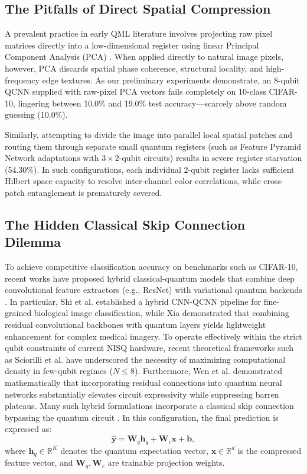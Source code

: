 \documentclass[10pt,twocolumn,twoside,a4paper]{article}
\begin{document}
\subsection{The Pitfalls of Direct Spatial Compression}
A prevalent practice in early QML literature involves projecting raw pixel matrices directly into a low-dimensional register using linear Principal Component Analysis (PCA) \cite{lloyd2014quantum}. When applied directly to natural image pixels, however, PCA discards spatial phase coherence, structural locality, and high-frequency edge textures. As our preliminary experiments demonstrate, an 8-qubit QCNN supplied with raw-pixel PCA vectors fails completely on 10-class CIFAR-10, lingering between 10.0\% and 19.0\% test accuracy---scarcely above random guessing (10.0\%).

Similarly, attempting to divide the image into parallel local spatial patches and routing them through separate small quantum registers (such as Feature Pyramid Network adaptations with $3 \times 2$-qubit circuits) results in severe register starvation (54.30\%). In such configurations, each individual 2-qubit register lacks sufficient Hilbert space capacity to resolve inter-channel color correlations, while cross-patch entanglement is prematurely severed.

\subsection{The Hidden Classical Skip Connection Dilemma}
To achieve competitive classification accuracy on benchmarks such as CIFAR-10, recent works have proposed hybrid classical-quantum models that combine deep convolutional feature extractors (e.g., ResNet) with variational quantum backends \cite{mari2020transfer, shi2023hybrid, xia2026lightweight, senokosov2024quantum}. In particular, Shi et al. \cite{shi2023hybrid} established a hybrid CNN-QCNN pipeline for fine-grained biological image classification, while Xia \cite{xia2026lightweight} demonstrated that combining residual convolutional backbones with quantum layers yields lightweight enhancement for complex medical imagery. To operate effectively within the strict qubit constraints of current NISQ hardware, recent theoretical frameworks such as Sciorilli et al. \cite{sciorilli2025towards} have underscored the necessity of maximizing computational density in few-qubit regimes ($N \le 8$). Furthermore, Wen et al. \cite{wen2024enhancing} demonstrated mathematically that incorporating residual connections into quantum neural networks substantially elevates circuit expressivity while suppressing barren plateaus. Many such hybrid formulations incorporate a classical skip connection bypassing the quantum circuit \cite{xia2026lightweight, wen2024enhancing}. In this configuration, the final prediction is expressed as:
\begin{equation}
    \hat{\mathbf{y}} = \mathbf{W}_q \mathbf{h}_q + \mathbf{W}_c \mathbf{x} + \mathbf{b},
    \label{eq:hybrid_skip_intro}
\end{equation}
where $\mathbf{h}_q \in \mathbb{R}^K$ denotes the quantum expectation vector, $\mathbf{x} \in \mathbb{R}^d$ is the compressed feature vector, and $\mathbf{W}_q, \mathbf{W}_c$ are trainable projection weights.
\end{document}
